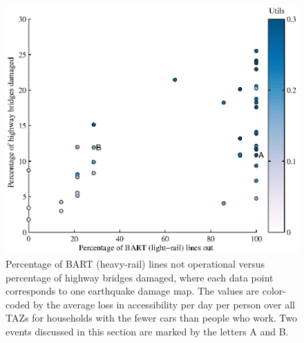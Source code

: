 





\begin{figure}[H]
\centering
\includegraphics[width=5in]{FIGS/equity_bart_bridges_acc3vJWBv4.eps} 
\caption{Percentage of BART (heavy-rail) lines not operational versus percentage of highway bridges damaged, where each data point corresponds to one earthquake damage map. The values are color-coded by the average loss in accessibility per day per person over all TAZs for households with the fewer cars than people who work. Two events discussed in this section are marked by the letters A and B.}
\label{fig:bartBri}
\end{figure}



